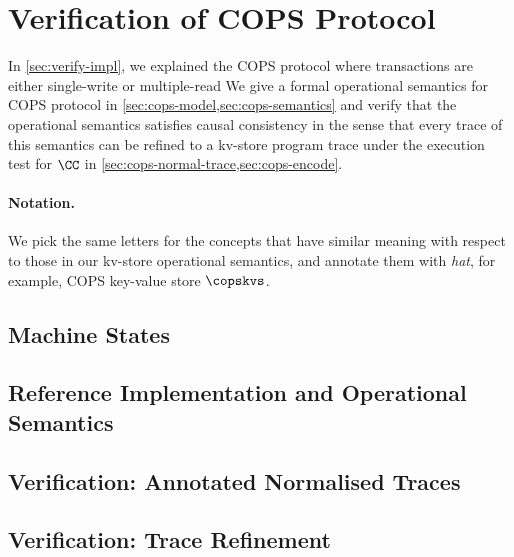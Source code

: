 \section{Verification of COPS Protocol} \label{sec:cops} 

In \cref{sec:verify-impl}, we explained the COPS protocol 
where transactions are either single-write or multiple-read
We give a formal operational semantics for COPS protocol in \cref{sec:cops-model,sec:cops-semantics}
and verify that the operational semantics satisfies causal consistency in the sense that
every trace of this semantics can be refined to a kv-store program trace under the execution test for \( \CC \) in \cref{sec:cops-normal-trace,sec:cops-encode}.

\paragraph{Notation.}
We pick the same letters for the concepts that have similar meaning with respect to those in our kv-store operational semantics,
and annotate them with \emph{hat}, for example, COPS key-value store \( \copskvs \).

\subsection{Machine States} \label{sec:cops-model}  
\subsection{Reference Implementation and Operational Semantics} \label{sec:cops-semantics}  
\subsection{Verification: Annotated Normalised Traces} 
\label{sec:cops-normal-trace}  
\label{sec:cops-extended-trace}  
\subsection{Verification: Trace Refinement} \label{sec:cops-encode}  
